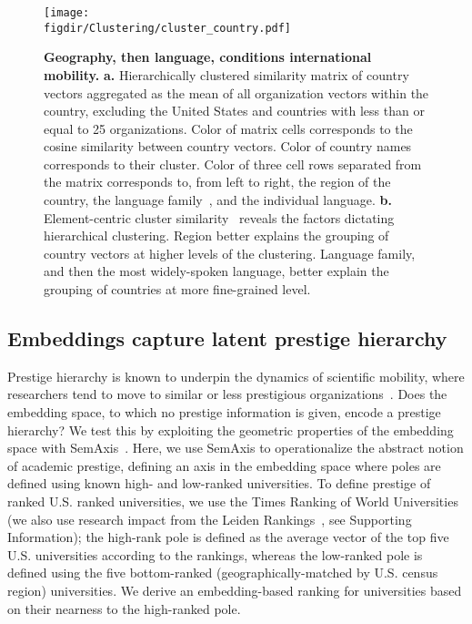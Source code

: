 \documentclass[12pt]{article} %
\def\figdir{../Figs}
\def\SI{Supporting Information}
\begin{document}
%
%
\begin{figure}[p!]
	\centering
	\texttt{[image: \\figdir/Clustering/cluster\_country.pdf]}
	\caption{
		\textbf{Geography, then language, conditions international mobility.}
		\textbf{a.} Hierarchically clustered similarity matrix of country vectors aggregated as the mean of all organization vectors within the country, excluding the United States and countries with less than or equal to 25 organizations.
		Color of matrix cells corresponds to the cosine similarity between country vectors.
		Color of country names corresponds to their cluster.
		Color of three cell rows separated from the matrix corresponds to, from left to right, the region of the country, the language family~\autocite{ethnologue}, and the individual language.
		\textbf{b.}	Element-centric cluster similarity~\autocite{gates2019element} reveals the factors dictating hierarchical clustering.
		Region better explains the grouping of country vectors at higher levels of the clustering.
		Language family, and then the most widely-spoken language, better explain the grouping of countries at more fine-grained level.
	}
	\label{fig:clustering}
\end{figure}



%
%
\subsection*{Embeddings capture latent prestige hierarchy}

Prestige hierarchy is known to underpin the dynamics of scientific mobility, where researchers tend to move to similar or less prestigious organizations~\autocite{deville2014career, clauset2015hierarchy}. Does the embedding space, to which no prestige information is given, encode a prestige hierarchy?
We test this by exploiting the geometric properties of the embedding space with SemAxis~\autocite{an2018semaxis}.
Here, we use SemAxis to operationalize the abstract notion of academic prestige, defining an axis in the embedding space where poles are defined using known high- and low-ranked universities.
To define prestige of ranked U.S. ranked universities, we use the Times Ranking of World Universities (we also use research impact from the Leiden Rankings~\autocite{waltman2012leidenrankings}, see \SI);
the high-rank pole is defined as the average vector of the top five U.S. universities according to the rankings, whereas the low-ranked pole is defined using the five bottom-ranked (geographically-matched by U.S. census region) universities.
We derive an embedding-based ranking for universities based on their nearness to the high-ranked pole.
\end{document}
